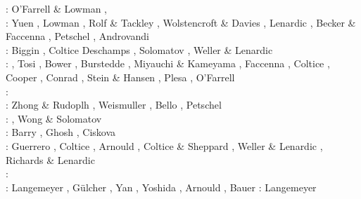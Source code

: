 \begin{scriptsize}
\twothousandten: O'Farrell \& Lowman \cite{oflo10}, \cite{bumb10}
                 \cite{detn10}\cite{yayh10}
                 \cite{nata10}\cite{hole10}
                 \cite{zhzl10}\cite{vayb10}
                 \cite{brmw10}\\
\twothousandeleven: Yuen \etal \cite{yutc11}, Lowman \cite{lowm11},
                    Rolf \& Tackley \cite{rota11}, Wolstencroft \& Davies \cite{woda11},
                    Lenardic \etal \cite{lemj11}, Becker \& Faccenna \cite{befa11},
                    Petschel \etal \cite{pewb11}, Androvandi \etal \cite{andl11}\\
\twothousandtwelve: Biggin \etal \cite{bisa12}, Coltice \etal \cite{cort12b}
                    Deschamps \etal \cite{deyt12}, Solomatov \cite{solo12}, 
                    Weller \& Lenardic \cite{wele12}\\
\twothousandthirteen: \cite{holj13}\cite{dadb13}, 
                      Tosi \etal \cite{toyd13}, Bower \etal \cite{bogs13a},
                      Burstedde \etal \cite{busa13}, Miyauchi \& Kameyama \cite{mika13},
                      Faccenna \etal \cite{fabc13}, Coltice \cite{cosr13},
                      Cooper \etal \cite{coml13}, Conrad \etal \cite{cost13},
                      Stein \& Hansen \cite{stha13}, Plesa \etal \cite{plth13},
                      O'Farrell \etal \cite{oflb13}\\
\twothousandfourteen: \cite{arfw14}\cite{helo14}\cite{crta14}\cite{flgw14}
                      \cite{roct14}\cite{cort14}\cite{becr14}
                      \cite{nata14}\cite{stha14}\cite{stlh14}\cite{ogaw14}\\
\twothousandfifteen: Zhong \& Rudoplh \cite{zhru15}, Weismuller \etal \cite{wegg15},
                     Bello \etal \cite{bect15}, Petschel \etal \cite{pesw15}\\
\twothousandsixteen: \cite{frbs16}\cite{sisc16}\cite{boba16}\cite{wele16}\cite{welm16}
                     \cite{vade16}\cite{chah16}, Wong \& Solomatov \cite{woso16b}\\
\twothousandseventeen: Barry \etal \cite{badw17}, Ghosh \etal \cite{ghts17}, 
                       Ciskova \etal \cite{civj17}\\
\twothousandeighteen: Guerrero \etal \cite{guld18}, Coltice \etal \cite{cold18}, 
                      Arnould \etal \cite{arcf18}, Coltice \& Sheppard \cite{cosh18}, 
                      Weller \& Lenardic \cite{wele18}, Richards \& Lenardic \cite{rile18}\\
\twothousandnineteen: \cite{gult19}\cite{mazh19}\cite{cohf19}\cite{lewh19}\cite{ulcw19}\cite{boba19}\cite{fube19}
      \cite{plju19}\\
\twothousandtwenty: Langemeyer \etal \cite{lalt20}, G\"ulcher \etal \cite{gugb20}, 
                    Yan \etal \cite{yabt20}, Yoshida \etal \cite{yosy20}, 
                    Arnould \etal \cite{arcf20}, Bauer \etal \cite{babd20}
\twothousandone: Langemeyer \etal \cite{lalt21}
\end{scriptsize}

